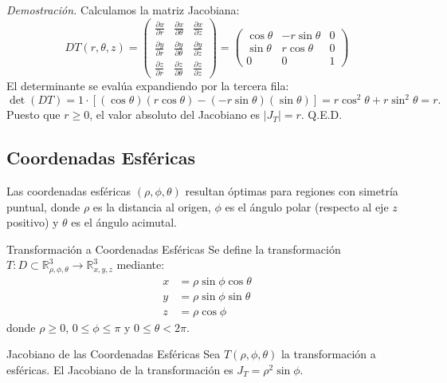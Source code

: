 \documentclass[11pt,a4paper]{article}
\begin{document}
\textit{Demostración.} Calculamos la matriz Jacobiana:
\[
D T(r,\theta,z) = \begin{pmatrix}
\frac{\partial x}{\partial r} & \frac{\partial x}{\partial \theta} & \frac{\partial x}{\partial z} \\
\frac{\partial y}{\partial r} & \frac{\partial y}{\partial \theta} & \frac{\partial y}{\partial z} \\
\frac{\partial z}{\partial r} & \frac{\partial z}{\partial \theta} & \frac{\partial z}{\partial z}
\end{pmatrix} = \begin{pmatrix}
\cos\theta & -r \sin\theta & 0 \\
\sin\theta & r \cos\theta & 0 \\
0 & 0 & 1
\end{pmatrix}
\]
El determinante se evalúa expandiendo por la tercera fila:
\[
\det(D T) = 1 \cdot \left[ (\cos\theta)(r \cos\theta) - (-r \sin\theta)(\sin\theta) \right] = r \cos^2\theta + r \sin^2\theta = r.
\]
Puesto que $r \geq 0$, el valor absoluto del Jacobiano es $|J_T| = r$. Q.E.D.

\subsection{Coordenadas Esféricas}

Las coordenadas esféricas $(\rho, \phi, \theta)$ resultan óptimas para regiones con simetría puntual, donde $\rho$ es la distancia al origen, $\phi$ es el ángulo polar (respecto al eje $z$ positivo) y $\theta$ es el ángulo acimutal.

\begin{definicionbox}{Transformación a Coordenadas Esféricas}{}
    Se define la transformación $T: D \subset \mathbb{R}^3_{\rho,\phi,\theta} \to \mathbb{R}^3_{x,y,z}$ mediante:
    \begin{align*}
        x &= \rho \sin\phi \cos\theta \\
        y &= \rho \sin\phi \sin\theta \\
        z &= \rho \cos\phi
    \end{align*}
    donde $\rho \geq 0$, $0 \leq \phi \leq \pi$ y $0 \leq \theta < 2\pi$.
\end{definicionbox}

\begin{teoremabox}{Jacobiano de las Coordenadas Esféricas}{}
    Sea $T(\rho, \phi, \theta)$ la transformación a esféricas. El Jacobiano de la transformación es $J_T = \rho^2 \sin\phi$.
\end{teoremabox}
\end{document}
